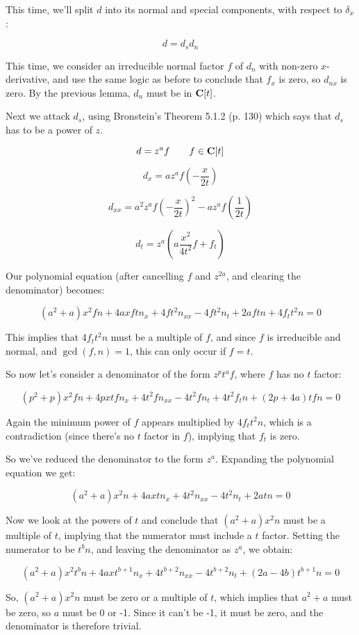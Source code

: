 \documentclass{article}
\newcommand{\C}{\ensuremath{{\bf C}}}
\begin{document}
This time, we'll split $d$ into its normal and special components,
with respect to $\delta_x$:

$$d =d_s d_n$$

This time, we consider an irreducible normal factor $f$ of $d_n$ with
non-zero $x$-derivative, and use the same logic as before to conclude
that $f_x$ is zero, so $d_{nx}$ is zero.  By the previous lemma,
$d_{n}$ must be in $\C[t]$.

Next we attack $d_s$, using Bronstein's Theorem 5.1.2 (p. 130) which
says that $d_s$ has to be a power of $z$.

$$d=z^a f \qquad f \in \C[t]$$

$$d_x = a z^a f \left( - \frac{x}{2t} \right)$$

$$d_{xx} = a^2 z^a f \left( - \frac{x}{2t} \right)^2 - a z^a f \left( \frac{1}{2t} \right)$$

$$d_t = z^a \left( a \frac{x^2}{4t^2} f + f_t\right)$$

Our polynomial equation (after cancelling $f$ and $z^{2a}$, and clearing the denominator) becomes:

$$(a^{2} +a)x^{2}fn +4axftn_x +4ft^{2}n_{xx} -4ft^{2}n_t +2aftn +4f_tt^{2}n = 0$$

This implies that $4f_tt^{2}n$ must be a multiple of $f$, and since $f$ is irreducible and normal,
and $\gcd(f,n)=1$, this can only occur if $f=t$.

So now let's consider a denominator of the form $z^p t^a f$, where $f$ has no $t$ factor:

$$(p^{2} +p)x^{2}fn +4pxtfn_x +4t^{2}fn_{xx} -4t^{2}fn_t +4t^{2}f_tn +(2p +4a)tfn = 0$$

Again the minimum power of $f$ appears multiplied by $4f_tt^{2}n$, which is a contradiction
(since there's no $t$ factor in $f$), implying that $f_t$ is zero.

So we've reduced the denominator to the form $z^a$.  Expanding the polynomial equation we get:

$$(a^{2} +a)x^{2}n +4axtn_x +4t^{2}n_{xx} -4t^{2}n_t +2atn = 0$$

Now we look at the powers of $t$ and conclude that $(a^{2}
+a)x^{2}n$ must be a multiple of $t$, implying that the numerator
must include a $t$ factor.  Setting the numerator to be $t^b n$, and
leaving the denominator as $z^a$, we obtain:

$$(a^{2} +a)x^{2}t^{b}n +4axt^{b +1}n_x +4t^{b +2}n_{xx} -4t^{b +2}n_t +(2a -4b)t^{b +1}n = 0$$

So, $(a^{2} +a)x^{2}n$ must be zero or a multiple of $t$, which implies that $a^2+a$ must be
zero, so $a$ must be 0 or -1.  Since it can't be -1, it must be zero,
and the denominator is therefore trivial.
\end{document}

